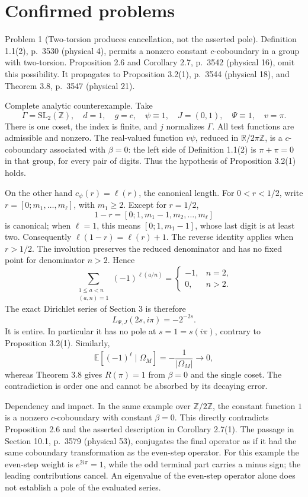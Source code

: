 \documentclass[10pt]{article}
\begin{document}
\section*{Confirmed problems}
Problem 1 (Two-torsion produces cancellation, not the asserted pole).  Definition 1.1(2), p. 3530 (physical 4), permits a nonzero constant \(c\)-coboundary in a group with two-torsion. Proposition 2.6 and Corollary 2.7, p. 3542 (physical 16), omit this possibility. It propagates to Proposition 3.2(1), p. 3544 (physical 18), and Theorem 3.8, p. 3547 (physical 21).\par
Complete analytic counterexample. Take \[\Gamma=\mathrm{SL}_2(\mathbb Z),\quad d=1,\quad
 g=c,\quad \psi\equiv1,\quad J=(0,1),\quad \Psi\equiv1,\quad v=\pi.\] There is one coset, the index is finite, and \(j\) normalizes \(\Gamma\). All test functions are admissible and nonzero. The real-valued function \(v\psi\), reduced in \(\mathbb R/2\pi\mathbb Z\), is a \(c\)-coboundary associated with \(\beta=0\): the left side of Definition 1.1(2) is \(\pi+\pi=0\) in that group, for every pair of digits. Thus the hypothesis of Proposition 3.2(1) holds.\par
On the other hand \(c_\psi(r)=\ell(r)\), the canonical length. For \(0<r<1/2\), write \(r=[0;m_1,\ldots,m_\ell]\), with \(m_1\ge2\). Except for \(r=1/2\), \[1-r=[0;1,m_1-1,m_2,\ldots,m_\ell]\] is canonical; when \(\ell=1\), this means \([0;1,m_1-1]\), whose last digit is at least two. Consequently \(\ell(1-r)=\ell(r)+1\). The reverse identity applies when \(r>1/2\). The involution preserves the reduced denominator and has no fixed point for denominator \(n>2\). Hence \[\sum_{\substack{1\le a<n\\(a,n)=1}}(-1)^{\ell(a/n)}
 =\begin{cases}-1,&n=2,\\0,&n>2.\end{cases}\] The exact Dirichlet series of Section 3 is therefore \[L_{\Psi,J}(2s,i\pi)=-2^{-2s}.
 \tag{2.1}\] It is entire. In particular it has no pole at \(s=1=s(i\pi)\), contrary to Proposition 3.2(1). Similarly, \[\mathbb E[(-1)^\ell\mid\Omega_M]=-\frac1{|\Omega_M|}
 \longrightarrow0,\] whereas Theorem 3.8 gives \(R(\pi)=1\) from \(\beta=0\) and the single coset. The contradiction is order one and cannot be absorbed by its decaying error.\par
Dependency and impact. In the same example over \(\mathbb Z/2\mathbb Z\), the constant function \(1\) is a nonzero \(c\)-coboundary with constant \(\beta=0\). This directly contradicts Proposition 2.6 and the asserted description in Corollary 2.7(1). The passage in Section 10.1, p. 3579 (physical 53), conjugates the final operator as if it had the same coboundary transformation as the even-step operator. For this example the even-step weight is \(e^{2i\pi}=1\), while the odd terminal part carries a minus sign; the leading contributions cancel. An eigenvalue of the even-step operator alone does not establish a pole of the evaluated series.\par
\end{document}

